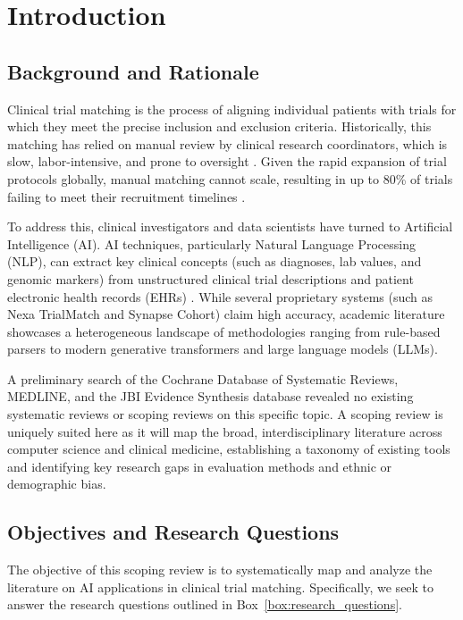 \section{Introduction}

\subsection{Background and Rationale}
Clinical trial matching is the process of aligning individual patients with trials for which they meet the precise inclusion and exclusion criteria. Historically, this matching has relied on manual review by clinical research coordinators, which is slow, labor-intensive, and prone to oversight \citep{smith2020manual}. Given the rapid expansion of trial protocols globally, manual matching cannot scale, resulting in up to 80\% of trials failing to meet their recruitment timelines \citep{jones2022recruitment}.

To address this, clinical investigators and data scientists have turned to Artificial Intelligence (AI). AI techniques, particularly Natural Language Processing (NLP), can extract key clinical concepts (such as diagnoses, lab values, and genomic markers) from unstructured clinical trial descriptions and patient electronic health records (EHRs) \citep{apex2024nlp}. While several proprietary systems (such as Nexa TrialMatch and Synapse Cohort) claim high accuracy, academic literature showcases a heterogeneous landscape of methodologies ranging from rule-based parsers to modern generative transformers and large language models (LLMs). 

A preliminary search of the Cochrane Database of Systematic Reviews, MEDLINE, and the JBI Evidence Synthesis database revealed no existing systematic reviews or scoping reviews on this specific topic. A scoping review is uniquely suited here as it will map the broad, interdisciplinary literature across computer science and clinical medicine, establishing a taxonomy of existing tools and identifying key research gaps in evaluation methods and ethnic or demographic bias.

\subsection{Objectives and Research Questions}
The objective of this scoping review is to systematically map and analyze the literature on AI applications in clinical trial matching. Specifically, we seek to answer the research questions outlined in Box~\ref{box:research_questions}.

